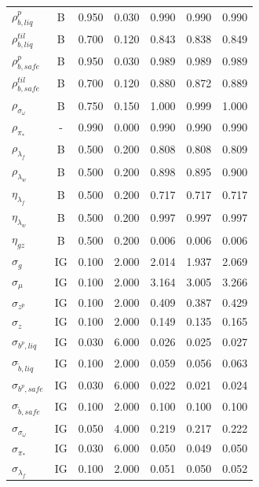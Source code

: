 \documentclass[12pt]{article}
\begin{document}
{\begin{longtable}{lcccccc}
$\rho_{b,liq}^{p}$ & B &    0.950 &    0.030 &    0.990 &    0.990 &    0.990 \\
$\rho_{b,liq}^{til}$ & B &    0.700 &    0.120 &    0.843 &    0.838 &    0.849 \\
$\rho_{b,safe}^{p}$ & B &    0.950 &    0.030 &    0.989 &    0.989 &    0.989 \\
$\rho_{b,safe}^{til}$ & B &    0.700 &    0.120 &    0.880 &    0.872 &    0.889 \\
$\rho_{\sigma_\omega}$ & B &    0.750 &    0.150 &    1.000 &    0.999 &    1.000 \\
$\rho_{\pi_*}$ & - &    0.990 &    0.000 &    0.990 &    0.990 &    0.990 \\
$\rho_{\lambda_f}$ & B &    0.500 &    0.200 &    0.808 &    0.808 &    0.809 \\
$\rho_{\lambda_w}$ & B &    0.500 &    0.200 &    0.898 &    0.895 &    0.900 \\
$\eta_{\lambda_f}$ & B &    0.500 &    0.200 &    0.717 &    0.717 &    0.717 \\
$\eta_{\lambda_w}$ & B &    0.500 &    0.200 &    0.997 &    0.997 &    0.997 \\
$\eta_{gz}$ & B &    0.500 &    0.200 &    0.006 &    0.006 &    0.006 \\
$\sigma_{g}$ & IG &    0.100 &    2.000 &    2.014 &    1.937 &    2.069 \\
$\sigma_{\mu}$ & IG &    0.100 &    2.000 &    3.164 &    3.005 &    3.266 \\
$\sigma_{z^p}$ & IG &    0.100 &    2.000 &    0.409 &    0.387 &    0.429 \\
$\sigma_{z}$ & IG &    0.100 &    2.000 &    0.149 &    0.135 &    0.165 \\
$\sigma_{b^p, liq}$ & IG &    0.030 &    6.000 &    0.026 &    0.025 &    0.027 \\
$\sigma_{\tilde{b}, liq}$ & IG &    0.100 &    2.000 &    0.059 &    0.056 &    0.063 \\
$\sigma_{b^p, safe}$ & IG &    0.030 &    6.000 &    0.022 &    0.021 &    0.024 \\
$\sigma_{\tilde{b}, safe}$ & IG &    0.100 &    2.000 &    0.100 &    0.100 &    0.100 \\
$\sigma_{\sigma_\omega}$ & IG &    0.050 &    4.000 &    0.219 &    0.217 &    0.222 \\
$\sigma_{\pi_*}$ & IG &    0.030 &    6.000 &    0.050 &    0.049 &    0.050 \\
$\sigma_{\lambda_f}$ & IG &    0.100 &    2.000 &    0.051 &    0.050 &    0.052 \\

\end{longtable}}
\end{document}
